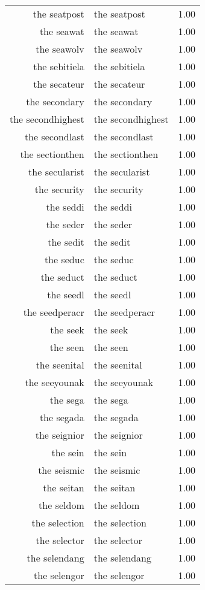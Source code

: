 \begin{table}[ht]
\begin{tabular}{rlr}
  the seatpost & the seatpost & 1.00 \\ 
  the seawat & the seawat & 1.00 \\ 
  the seawolv & the seawolv & 1.00 \\ 
  the sebitiela & the sebitiela & 1.00 \\ 
  the secateur & the secateur & 1.00 \\ 
  the secondary & the secondary & 1.00 \\ 
  the secondhighest & the secondhighest & 1.00 \\ 
  the secondlast & the secondlast & 1.00 \\ 
  the sectionthen & the sectionthen & 1.00 \\ 
  the secularist & the secularist & 1.00 \\ 
  the security & the security & 1.00 \\ 
  the seddi & the seddi & 1.00 \\ 
  the seder & the seder & 1.00 \\ 
  the sedit & the sedit & 1.00 \\ 
  the seduc & the seduc & 1.00 \\ 
  the seduct & the seduct & 1.00 \\ 
  the seedl & the seedl & 1.00 \\ 
  the seedperacr & the seedperacr & 1.00 \\ 
  the seek & the seek & 1.00 \\ 
  the seen & the seen & 1.00 \\ 
  the seenital & the seenital & 1.00 \\ 
  the seeyounak & the seeyounak & 1.00 \\ 
  the sega & the sega & 1.00 \\ 
  the segada & the segada & 1.00 \\ 
  the seignior & the seignior & 1.00 \\ 
  the sein & the sein & 1.00 \\ 
  the seismic & the seismic & 1.00 \\ 
  the seitan & the seitan & 1.00 \\ 
  the seldom & the seldom & 1.00 \\ 
  the selection & the selection & 1.00 \\ 
  the selector & the selector & 1.00 \\ 
  the selendang & the selendang & 1.00 \\ 
  the selengor & the selengor & 1.00 \\ 

\end{tabular}
\end{table}
